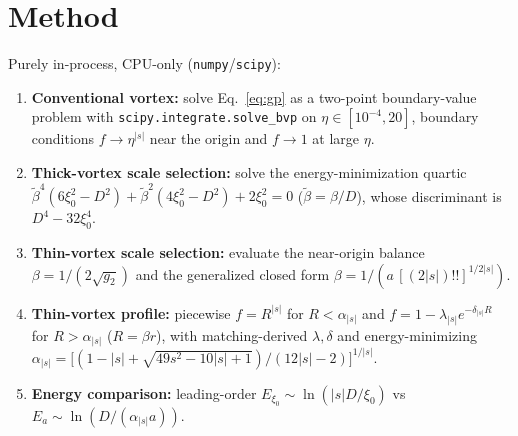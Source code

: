 \documentclass[11pt]{article}
\begin{document}
\section{Method}
Purely in-process, CPU-only (\texttt{numpy}/\texttt{scipy}):
\begin{enumerate}
\item \textbf{Conventional vortex:} solve Eq.~\eqref{eq:gp} as a two-point
boundary-value problem with \texttt{scipy.integrate.solve\_bvp} on
$\eta\in[10^{-4},20]$, boundary conditions $f\!\to\!\eta^{|s|}$ near the origin
and $f\!\to\!1$ at large $\eta$.
\item \textbf{Thick-vortex scale selection:} solve the energy-minimization
quartic $\tilde\beta^4(6\xi_0^2-D^2)+\tilde\beta^2(4\xi_0^2-D^2)+2\xi_0^2=0$
($\tilde\beta=\beta/D$), whose discriminant is $D^4-32\xi_0^4$.
\item \textbf{Thin-vortex scale selection:} evaluate the near-origin balance
$\beta=1/(2\sqrt{g_2})$ and the generalized closed form
$\beta = 1/(a\,[(2|s|)!!]^{1/2|s|})$.
\item \textbf{Thin-vortex profile:} piecewise $f=R^{|s|}$ for $R<\alpha_{|s|}$
and $f = 1-\lambda_{|s|}e^{-\delta_{|s|}R}$ for $R>\alpha_{|s|}$ ($R=\beta r$),
with matching-derived $\lambda,\delta$ and energy-minimizing
$\alpha_{|s|}=\big[(1-|s|+\sqrt{49s^2-10|s|+1})/(12|s|-2)\big]^{1/|s|}$.
\item \textbf{Energy comparison:} leading-order
$E_{\xi_0}\sim \ln(|s|D/\xi_0)$ vs $E_{a}\sim \ln(D/(\alpha_{|s|}a))$.
\end{enumerate}
\end{document}
